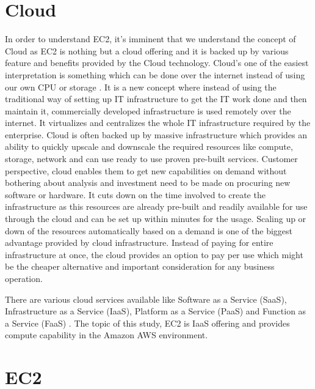 \section{Cloud}

In order to understand EC2, it's imminent that we understand the concept of Cloud as EC2 is nothing but a cloud offering and it is backed up by various feature and benefits provided by the Cloud technology. Cloud's one of the easiest interpretation is something which can be done over the internet instead of using our own CPU or storage \cite{hid-sp18-402-www-infoworld}. It is a new concept where instead of using the traditional way of setting up IT infrastructure to get the IT work done and then maintain it, commercially developed infrastructure is used remotely over the internet. It virtualizes and centralizes the whole IT infrastructure required by the enterprise. Cloud is often backed up by massive infrastructure which provides an ability to quickly upscale and downscale the required resources like compute, storage, network and can use ready to use proven pre-built services. Customer perspective, cloud enables them to get new capabilities on demand without bothering about analysis and investment need to be made on procuring new software or hardware. It cuts down on the time involved to create the infrastructure as this resources are already pre-built and readily available for use through the cloud and can be set up within minutes for the usage. Scaling up or down of the resources automatically based on a demand is one of the biggest advantage provided by cloud infrastructure. Instead of paying for entire infrastructure at once, the cloud provides an option to pay per use which might be the cheaper alternative and important consideration for any business operation.

There are various cloud services available like Software as a Service (SaaS), Infrastructure as a Service (IaaS), Platform as a Service (PaaS) and Function as a Service (FaaS) \cite{hid-sp18-402-www-infoworld}. The topic of this study, EC2 is IaaS offering and provides compute capability in the Amazon AWS environment.

\section{EC2}

